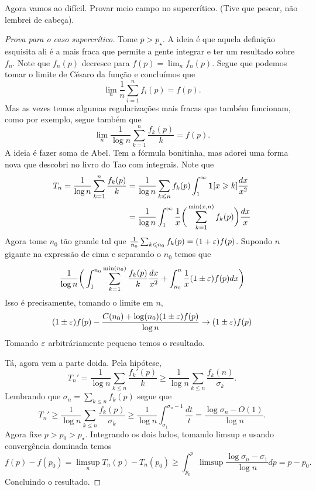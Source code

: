 Agora vamos ao difícil. Provar meio campo no supercrítico.
(Tive que pescar, não lembrei de cabeça).
\begin{proof}[Prova para o caso supercrítico]
	Tome $p > p_\star$. A ideia é que aquela definição esquisita ali é a mais fraca
	que permite a gente integrar e ter um resultado sobre $f_n$. Note
	que $f_n(p)$ decresce
	para $f(p) = \lim_n f_n(p)$. Segue que podemos tomar o limite de
	Césaro da função e
	concluímos que
	\[
		\lim_{n} \frac{1}{n}\sum_{i = 1}^n f_i(p) = f(p).
	\]
	Mas as vezes temos algumas regularizações mais fracas que também
	funcionam, como
	por exemplo, segue também que
	\[
		\lim_n \frac{1}{\log n} \sum_{k = 1}^n \frac{f_k(p)}{k} = f(p).
	\]
	A ideia é fazer soma de Abel. Tem a fórmula bonitinha, mas adorei
	uma forma nova
	que descobri no livro do Tao com integrais.
	Note que
	\begin{align*}
		T_n = \frac{1}{\log n} \sum_{k = 1}^n \frac{f_k(p)}{k}
		&= \frac{1}{\log n} \sum_{k \leqslant n} f_k(p)\int_{1}^{\infty} \bm{1}[x
		\geqslant k]\frac{dx}{x^2}\\
		&= \frac{1}{\log n} \int_{1}^\infty \frac{1}{x}\bigg(\sum_{k =
		1}^{\min(x, n)} f_k(p)\bigg) \frac{dx}{x}
	\end{align*}
	Agora tome $n_0$ tão grande tal que $\frac{1}{n_0} \sum_{k \leqslant n_0}
	f_k(p) = (1 + \varepsilon)f(p)$.
	Supondo $n$ gigante na expressão de cima e separando o $n_0$ temos que
	\[
		\frac{1}{\log n}\bigg(\int_{1}^{n_0} \sum_{k =
			1}^{\min(n_0)}\frac{f_k(p)}{k} \frac{dx}{x^2}
		+ \int_{n_0}^{n} \frac{1}{x} (1 \pm \varepsilon)f(p) dx \bigg)
	\]
	Isso é precisamente, tomando o limite em $n$,
	\[
		(1 \pm \varepsilon)f(p) - \frac{C(n_0) + \log(n_0) (1 \pm \varepsilon)f(p)}{\log
		n} \rightarrow (1 \pm \varepsilon)f(p)
	\]
	Tomando $\varepsilon$ arbitráriamente pequeno temos o resultado.

	Tá, agora vem a parte doida. Pela hipótese,
	\[
		T_n' = \frac{1}{\log n} \sum_{k \leq n} \frac{f_k'(p)}{k} \geq
		\frac{1}{\log n} \sum_{k \leq n} \frac{f_k(n)}{\sigma_k}.
	\]
	Lembrando que $\sigma_n = \sum_{k \leq n} f_k(p)$ segue que
	\[
		T_n'\geq \frac{1}{\log n} \sum_{k \leq n} \frac{f_k(p)}{\sigma_k}
		\geq \frac{1}{\log n} \int_{\sigma_1}^{\sigma_n - 1} \frac{dt}{t} =
		\frac{\log \sigma_n - O(1)}{\log n}.
	\]
	Agora fixe $p > p_0 > p_\star$. Integrando os dois lados, tomando
	limsup e usando convergência
	dominada temos
	\[
		f(p) - f(p_0) = \limsup_n T_n(p) - T_n(p_0) \geq \int_{p_0}^p
		\limsup \frac{\log \sigma_n - \sigma_1}{\log n} dp = p - p_0.
	\]
	Concluindo o resultado.
\end{proof}
